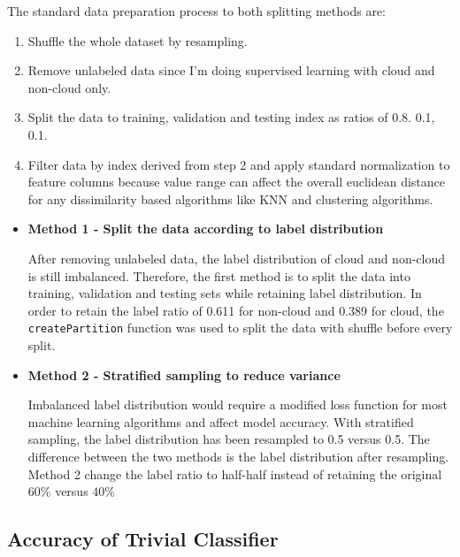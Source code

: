 \documentclass[11pt]{article}
\begin{document}
The standard data preparation process to both splitting methods are:
\begin{enumerate}[1.]
\item Shuffle the whole dataset by resampling.
\item Remove unlabeled data since I'm doing supervised learning with cloud and non-cloud only.
\item Split the data to training, validation and testing index as ratios of 0.8. 0.1, 0.1.
\item Filter data by index derived from step 2 and apply standard normalization to feature columns because value range can affect the overall euclidean distance for any dissimilarity based algorithms like KNN and clustering algorithms. 
\end{enumerate}
\begin{itemize}
  \item \textbf{Method 1 -  Split the data according to label distribution}
 
 After removing unlabeled data, the label distribution of cloud and non-cloud is still imbalanced. Therefore, the first method is to split the data into training, validation and testing sets while retaining label distribution. In order to retain the label ratio of 0.611 for non-cloud and 0.389 for cloud, the \texttt{createPartition} function was used to split the data with shuffle before every split. 
 
 \item \textbf{Method 2 - Stratified sampling to reduce variance}
 
Imbalanced label distribution would require a modified loss function for most machine learning algorithms and affect model accuracy. With stratified sampling, the label distribution has been resampled to 0.5 versus 0.5. The difference between the two methods is the label distribution after resampling. Method 2 change the label ratio to half-half instead of retaining the original $60\%$ versus $40\%$
\end{itemize}

\subsection{Accuracy of Trivial Classifier}
\end{document}
